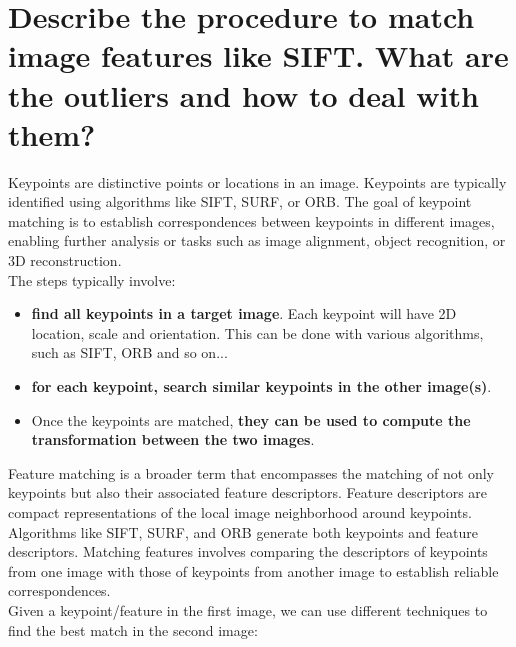\documentclass{article}
\begin{document}
\newpage

\section{Describe the procedure to match image features like SIFT. What are the outliers and how to deal with them?}

Keypoints are distinctive points or locations in an image. Keypoints are typically identified using algorithms like SIFT, SURF, or ORB. The goal of keypoint matching is to establish correspondences between keypoints in different images, enabling further analysis or tasks such as image alignment, object recognition, or 3D reconstruction. \\

The steps typically involve:
\begin{itemize}
    \item \textbf{find all keypoints in a target image}. Each keypoint will have 2D location, scale and orientation. This can be done with various algorithms, such as SIFT, ORB and so on...
    \item \textbf{for each keypoint, search similar keypoints in the other image(s)}.
    \item Once the keypoints are matched, \textbf{they can be used to compute the transformation between the two images}.
\end{itemize}

Feature matching is a broader term that encompasses the matching of not only keypoints but also their associated feature descriptors. Feature descriptors are compact representations of the local image neighborhood around keypoints. Algorithms like SIFT, SURF, and ORB generate both keypoints and feature descriptors. Matching features involves comparing the descriptors of keypoints from one image with those of keypoints from another image to establish reliable correspondences. \\

Given a keypoint/feature in the first image, we can use different techniques to find the best match in the second image:
\end{document}
